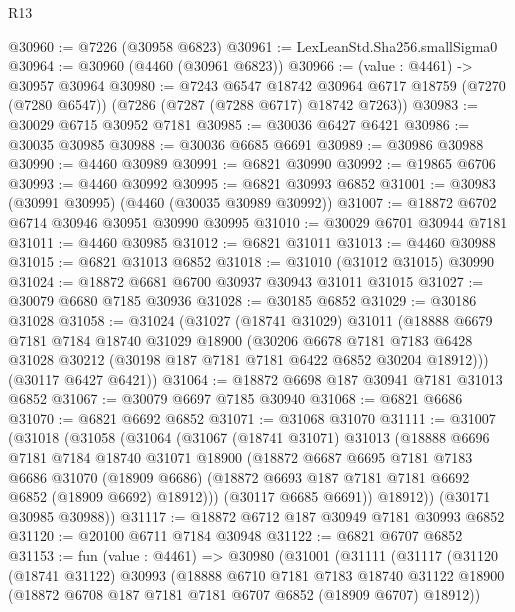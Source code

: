 \begin{lexlean}{R13}
\begin{coremodule}
@30960 := @7226 (@30958 @6823)
@30961 := LexLeanStd.Sha256.smallSigma0
@30964 := @30960 (@4460 (@30961 @6823))
@30966 := (value : @4461) -> @30957 @30964
@30980 := @7243
    @6547
    @18742
    @30964
    @6717
    @18759
    (@7270 (@7280 @6547))
    (@7286 (@7287 (@7288 @6717) @18742 @7263))
@30983 := @30029 @6715 @30952 @7181
@30985 := @30036 @6427 @6421
@30986 := @30035 @30985
@30988 := @30036 @6685 @6691
@30989 := @30986 @30988
@30990 := @4460 @30989
@30991 := @6821 @30990
@30992 := @19865 @6706
@30993 := @4460 @30992
@30995 := @6821 @30993 @6852
@31001 := @30983 (@30991 @30995) (@4460 (@30035 @30989 @30992))
@31007 := @18872 @6702 @6714 @30946 @30951 @30990 @30995
@31010 := @30029 @6701 @30944 @7181
@31011 := @4460 @30985
@31012 := @6821 @31011
@31013 := @4460 @30988
@31015 := @6821 @31013 @6852
@31018 := @31010 (@31012 @31015) @30990
@31024 := @18872 @6681 @6700 @30937 @30943 @31011 @31015
@31027 := @30079 @6680 @7185 @30936
@31028 := @30185 @6852
@31029 := @30186 @31028
@31058 := @31024
    (@31027
      (@18741 @31029)
      @31011
      (@18888
        @6679
        @7181
        @7184
        @18740
        @31029
        @18900
        (@30206
          @6678
          @7181
          @7183
          @6428
          @31028
          @30212
          (@30198 @187 @7181 @7181 @6422 @6852 @30204 @18912)))
      (@30117 @6427 @6421))
@31064 := @18872 @6698 @187 @30941 @7181 @31013 @6852
@31067 := @30079 @6697 @7185 @30940
@31068 := @6821 @6686
@31070 := @6821 @6692 @6852
@31071 := @31068 @31070
@31111 := @31007
    (@31018
      (@31058
        (@31064
          (@31067
            (@18741 @31071)
            @31013
            (@18888
              @6696
              @7181
              @7184
              @18740
              @31071
              @18900
              (@18872
                @6687
                @6695
                @7181
                @7183
                @6686
                @31070
                (@18909 @6686)
                (@18872 @6693 @187 @7181 @7181 @6692 @6852 (@18909 @6692) @18912)))
            (@30117 @6685 @6691))
          @18912))
      (@30171 @30985 @30988))
@31117 := @18872 @6712 @187 @30949 @7181 @30993 @6852
@31120 := @20100 @6711 @7184 @30948
@31122 := @6821 @6707 @6852
@31153 := fun (value : @4461) =>
  @30980
    (@31001
      (@31111
        (@31117
          (@31120
            (@18741 @31122)
            @30993
            (@18888
              @6710
              @7181
              @7183
              @18740
              @31122
              @18900
              (@18872 @6708 @187 @7181 @7181 @6707 @6852 (@18909 @6707) @18912))

\end{coremodule}
\end{lexlean}
